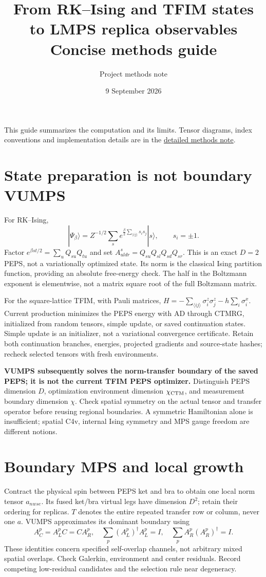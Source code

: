 \documentclass[11pt]{article}
\title{From RK--Ising and TFIM states to LMPS replica observables\\\large Concise methods guide}
\author{Project methods note}\date{9 September 2026}
\begin{document}
\maketitle
\noindent This guide summarizes the computation and its limits. Tensor diagrams,
index conventions and implementation details are in the
\href{detailed.pdf}{detailed methods note}.

\section{State preparation is not boundary VUMPS}
For RK--Ising,
\[
 |\Psi_\beta\rangle=Z^{-1/2}\sum_s
 e^{\frac\beta2\sum_{\langle ij\rangle}s_i s_j}|s\rangle,
 \qquad s_i=\pm1.
\]
Factor $e^{\beta st/2}=\sum_uQ_{su}Q_{tu}$ and set
$A^s_{uldr}=Q_{su}Q_{sl}Q_{sd}Q_{sr}$. This is an exact $D=2$ PEPS, not a
variationally optimized state. Its norm is the classical Ising partition
function, providing an absolute free-energy check. The half in the Boltzmann
exponent is elementwise, not a matrix square root of the full Boltzmann matrix.

For the square-lattice TFIM, with Pauli matrices,
$H=-\sum_{\langle ij\rangle}\sigma_i^z\sigma_j^z-h\sum_i\sigma_i^x$.
Current production minimizes the PEPS energy with AD through CTMRG, initialized
from random tensors, simple update, or saved continuation states. Simple update
is an initializer, not a variational convergence certificate. Retain both
continuation branches, energies, projected gradients and source-state hashes;
recheck selected tensors with fresh environments.

\textbf{VUMPS subsequently solves the norm-transfer boundary of the saved
PEPS; it is not the current TFIM PEPS optimizer.} Distinguish PEPS dimension
$D$, optimization environment dimension $\chi_{\rm CTM}$, and measurement
boundary dimension $\chi$. Check spatial symmetry on the actual tensor and
transfer operator before reusing regional boundaries. A symmetric Hamiltonian
alone is insufficient; spatial C4v, internal Ising symmetry and MPS gauge
freedom are different notions.

\section{Boundary MPS and local growth}
Contract the physical spin between PEPS ket and bra to obtain one local norm
tensor $a_{nwse}$. Its fused ket/bra virtual legs have dimension $D^2$; retain
their ordering for replicas. $T$ denotes the entire repeated transfer row or
column, never one $a$. VUMPS approximates its dominant boundary using
\[
 A_C^p=A_L^pC=CA_R^p,\quad
 \sum_p(A_L^p)^\dagger A_L^p=I,\quad
 \sum_p A_R^p(A_R^p)^\dagger=I.
\]
These identities concern specified self-overlap channels, not arbitrary mixed
spatial overlaps. Check Galerkin, environment and center residuals. Record
competing low-residual candidates and the selection rule near degeneracy.
\end{document}
